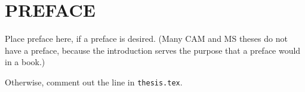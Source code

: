\chapter*{PREFACE}

Place preface here, if a preface is desired.
(Many CAM and MS theses do not have a preface, because the
introduction serves the purpose that a preface would
in a book.)


Otherwise, comment out 
the line
\verb++
in \verb+thesis.tex+.




